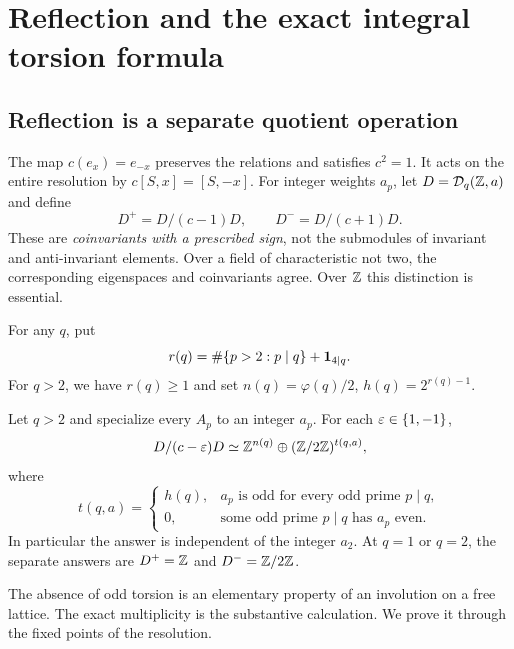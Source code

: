 \section{Reflection and the exact integral torsion formula}
\label{ir:sec:reflection}

\subsection{Reflection is a separate quotient operation}
The map $c(e_x)=e_{-x}$ preserves the relations and satisfies $c^2=1$.
It acts on the entire resolution by $c[S,x]=[S,-x]$.
For integer weights $a_p$, let $D=\mathcal D_q(\mathbb Z,a)$ and define
\[
 D^+=D/(c-1)D,\qquad D^-=D/(c+1)D.
\]
These are \emph{coinvariants with a prescribed sign}, not the submodules
of invariant and anti-invariant elements. Over a field of characteristic
not two, the corresponding eigenspaces and coinvariants agree. Over
$\mathbb Z$ this distinction is essential.

For any $q$, put
\begin{equation}\label{ir:eq:r-h}
 r(q)=\#\{p>2:p\mid q\}+\mathbf 1_{4\mid q}.
\end{equation}
For $q>2$, we have $r(q)\ge1$ and set
$n(q)=\varphi(q)/2$, $h(q)=2^{r(q)-1}$.

\begin{theorem}
\label{ir:thm:integer-reflection}
Let $q>2$ and specialize every $A_p$ to an integer $a_p$. For each
$\varepsilon\in\{1,-1\}$,
\begin{equation}\label{ir:eq:integer-reflection}
 D/(c-\varepsilon)D\simeq\mathbb Z^{n(q)}\oplus(\mathbb Z/2\mathbb Z)^{t(q,a)},
\end{equation}
where
\begin{equation}\label{ir:eq:torsion-count}
 t(q,a)=
 \begin{cases}
  h(q),&a_p\text{ is odd for every odd prime }p\mid q,\\
  0,&\text{some odd prime }p\mid q\text{ has }a_p\text{ even}.
 \end{cases}
\end{equation}
In particular the answer is independent of the integer $a_2$.
At $q=1$ or $q=2$, the separate answers are $D^+=\mathbb Z$ and
$D^-=\mathbb Z/2\mathbb Z$.
\end{theorem}

The absence of odd torsion is an elementary property of an involution
on a free lattice. The exact multiplicity is the substantive calculation.
We prove it through the fixed points of the resolution.

